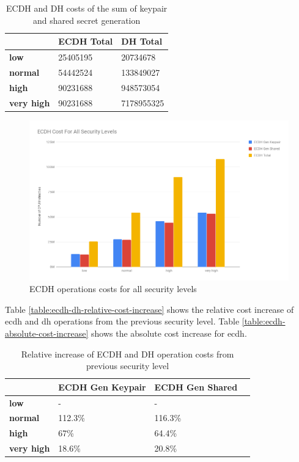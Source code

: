 \documentclass{llncs}
\begin{document}
\begin{table}[]
\begin{tabular}{|l|l|l|}
\hline
                   & \textbf{ECDH Total} & \textbf{DH Total} \\ \hline
\textbf{low}       & 25405195            & 20734678          \\ \hline
\textbf{normal}    & 54442524            & 133849027         \\ \hline
\textbf{high}      & 90231688            & 948573054         \\ \hline
\textbf{very high} & 90231688            & 7178955325        \\ \hline
\end{tabular}
\caption{\label{table:ecdh-dh-costs-total-all-sls} ECDH and DH costs of the sum of keypair and shared secret generation}
\end{table}

\begin{figure}
  \centering
  \includegraphics[width=1.0\textwidth]{img/ecdh_cost_all_sls.png}
  \caption{\label{fig:ecdh-costs-all-sls} ECDH operations costs for all security levels}
\end{figure}

Table \ref{table:ecdh-dh-relative-cost-increase} shows the relative cost increase of \gls{ecdh} and \gls{dh} operations from the previous security
level.  Table \ref{table:ecdh-absolute-cost-increase} shows the absolute cost increase for \gls{ecdh}.

\begin{table}[]
  \begin{tabular}{|l|l|l|l|}
  \hline
                     & \textbf{ECDH Gen Keypair} & \textbf{ECDH Gen Shared} \\ \hline
  \textbf{low}       & -                         & -                        \\ \hline
  \textbf{normal}    & 112.3\%                   & 116.3\%                  \\ \hline
  \textbf{high}      & 67\%                      & 64.4\%                   \\ \hline
  \textbf{very high} & 18.6\%                    & 20.8\%                   \\ \hline
  \end{tabular}
  \caption{\label{table:echdh-realative-cost-increase} Relative increase of ECDH and DH operation costs from previous security level}
  \end{table}
\end{document}
